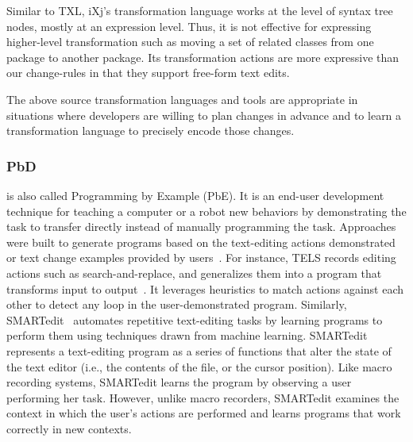 \documentclass[runningheads,a4paper]{llncs}
\begin{document}
Similar to TXL, iXj's transformation language works at the level of syntax tree nodes, mostly at an expression level. Thus, it is not effective for expressing higher-level transformation such as moving a set of related classes from one package to another package. Its transformation actions are more expressive than our change-rules in that they support free-form text edits.

The above source transformation languages and tools are appropriate in situations where developers are willing to plan changes in advance and to learn a transformation language to precisely encode those changes.

\subsubsection{PbD} is also called Programming by Example (PbE). It is an end-user development technique for teaching a computer or a robot new behaviors by demonstrating the task to transfer directly instead of manually programming the task.
Approaches were built to generate programs based on the text-editing actions demonstrated or text change examples provided by users~\cite{Nix1984,WiM1993,LaH1995,LWD2001}. For instance, 
TELS records editing actions such as search-and-replace, and generalizes them into a program that transforms input to output~\cite{WiM1993}. It leverages heuristics to match actions against each other to detect any loop in the user-demonstrated program. 
Similarly, SMARTedit~\cite{LWD2001} automates repetitive text-editing tasks by learning programs to perform them using techniques drawn from machine learning. SMARTedit represents a text-editing program as a series of functions that alter the state of the text editor (i.e., the contents of the file, or the cursor position). Like macro recording systems, SMARTedit learns the program by observing a user performing her task. However, unlike macro recorders, SMARTedit examines the context in which the user's actions are performed and learns programs that work correctly in new contexts. 
\end{document}

